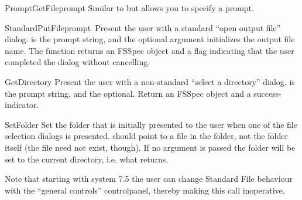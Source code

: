 \begin{funcdesc}{PromptGetFile}{prompt}
Similar to  but allows you to specify a prompt.
\end{funcdesc}

\begin{funcdesc}{StandardPutFile}{prompt\, }
Present the user with a standard ``open output file''
dialog.  is the prompt string, and the optional
 argument initializes the output file name. The function
returns an FSSpec object and a flag indicating that the user completed
the dialog without cancelling.
\end{funcdesc}

\begin{funcdesc}{GetDirectory}{}
Present the user with a non-standard ``select a directory''
dialog.  is the prompt string, and the optional.
Return an FSSpec object and a success-indicator.
\end{funcdesc}

\begin{funcdesc}{SetFolder}{}
Set the folder that is initially presented to the user when one of
the file selection dialogs is presented.  should point to
a file in the folder, not the folder itself (the file need not exist,
though). If no argument is passed the folder will be set to the
current directory, i.e. what  returns.

Note that starting with system 7.5 the user can change Standard File
behaviour with the ``general controls'' controlpanel, thereby making
this call inoperative.
\end{funcdesc}

